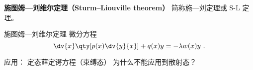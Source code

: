 
\begin{issues}
\issueDraft
\end{issues}

\textbf{施图姆—刘维尔定理（Sturm–Liouville theorem）} 简称施—刘定理或 S-L 定理。

\begin{theorem}{施图姆—刘维尔定理}
微分方程
\begin{equation}
\dv{x}\qty[p(x)\dv{y}{x}] + q(x) y = -\lambda w(x) y~.
\end{equation}
\end{theorem}

应用： 定态薛定谔方程（束缚态） 为什么不能应用到散射态？
